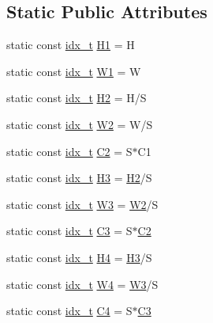 \subsection*{Static Public Attributes}
\begin{DoxyCompactItemize}
\item 
static const \hyperlink{vgg__util_8h_a8e93478a00e685bea5e6a3f617bf03a3}{idx\+\_\+t} \hyperlink{structVGG_a73f189c70eef33b8e8de32929db37b10}{H1} = H
\item 
static const \hyperlink{vgg__util_8h_a8e93478a00e685bea5e6a3f617bf03a3}{idx\+\_\+t} \hyperlink{structVGG_a01305ab6d90c95eb50c45352203b07e0}{W1} = W
\item 
static const \hyperlink{vgg__util_8h_a8e93478a00e685bea5e6a3f617bf03a3}{idx\+\_\+t} \hyperlink{structVGG_a6658da7d5fd275b2af6eb75511ba6f80}{H2} = H/S
\item 
static const \hyperlink{vgg__util_8h_a8e93478a00e685bea5e6a3f617bf03a3}{idx\+\_\+t} \hyperlink{structVGG_ac4a4d00b5e2ee41b1d4e8861bbc6c499}{W2} = W/S
\item 
static const \hyperlink{vgg__util_8h_a8e93478a00e685bea5e6a3f617bf03a3}{idx\+\_\+t} \hyperlink{structVGG_a1e9ad0d15e42696798d44b06ad3c9a9a}{C2} = S$\ast$C1
\item 
static const \hyperlink{vgg__util_8h_a8e93478a00e685bea5e6a3f617bf03a3}{idx\+\_\+t} \hyperlink{structVGG_aad221438514d3b1a829d7f9c27a6f5ea}{H3} = \hyperlink{structVGG_a6658da7d5fd275b2af6eb75511ba6f80}{H2}/S
\item 
static const \hyperlink{vgg__util_8h_a8e93478a00e685bea5e6a3f617bf03a3}{idx\+\_\+t} \hyperlink{structVGG_ad3bde49e961175621e0937584dae0af0}{W3} = \hyperlink{structVGG_ac4a4d00b5e2ee41b1d4e8861bbc6c499}{W2}/S
\item 
static const \hyperlink{vgg__util_8h_a8e93478a00e685bea5e6a3f617bf03a3}{idx\+\_\+t} \hyperlink{structVGG_a88a35c950ca73035ad75644925c05061}{C3} = S$\ast$\hyperlink{structVGG_a1e9ad0d15e42696798d44b06ad3c9a9a}{C2}
\item 
static const \hyperlink{vgg__util_8h_a8e93478a00e685bea5e6a3f617bf03a3}{idx\+\_\+t} \hyperlink{structVGG_a1754afced5b0bbb91031179c1f58ee29}{H4} = \hyperlink{structVGG_aad221438514d3b1a829d7f9c27a6f5ea}{H3}/S
\item 
static const \hyperlink{vgg__util_8h_a8e93478a00e685bea5e6a3f617bf03a3}{idx\+\_\+t} \hyperlink{structVGG_a9728cd3ccfa5011d2a795dff7e9abfe8}{W4} = \hyperlink{structVGG_ad3bde49e961175621e0937584dae0af0}{W3}/S
\item 
static const \hyperlink{vgg__util_8h_a8e93478a00e685bea5e6a3f617bf03a3}{idx\+\_\+t} \hyperlink{structVGG_a4d54a1cc3e99340dfb67e7252719c663}{C4} = S$\ast$\hyperlink{structVGG_a88a35c950ca73035ad75644925c05061}{C3}

\end{DoxyCompactItemize}
